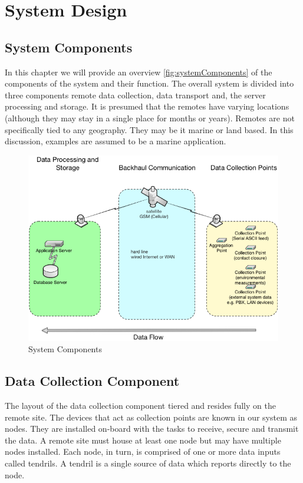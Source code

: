 \chapter{System Design}

\section{System Components}
In this chapter we will provide an overview \autoref{fig:systemComponents} of the components of the system and their function. The overall system is divided into three components remote data collection, data transport and, the server processing and storage.  It is presumed that the remotes have varying locations (although they may stay in a single place for months or years). Remotes are not specifically tied to any geography.  They may be it marine or land based. In this discussion, examples are assumed to be a marine application.  

\begin{figure}
\centering
\includegraphics{Figures/systemComponentOverview}
\caption{System Components}
\label{fig:systemComponents}
\end{figure}
\section{Data Collection Component}

The layout of the data collection component tiered and resides fully on the remote site.  The devices that act as collection points are known in our system as nodes.  They are installed on-board with the tasks to receive, secure and transmit the data.  A remote site must house at least one node but may have multiple nodes installed.  Each node, in turn, is comprised of one or more data inputs called tendrils.  A tendril is a single source of data which reports directly to the node. 

